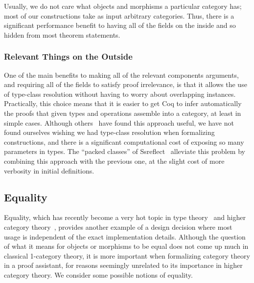 \documentclass[runningheads]{llncs}
\begin{document}
  	  Usually, we do not care what objects and morphisms a particular category has; most of our constructions take as input arbitrary categories.  Thus, there is a significant performance benefit to having all of the fields on the inside and so hidden from most theorem statements.

    \subsubsection{Relevant Things on the Outside}
      One of the main benefits to making all of the relevant components arguments, and requiring all of the fields to satisfy proof irrelevance, is that it allows the use of type-class resolution without having to worry about overlapping instances.  Practically, this choice means that it is easier to get Coq to infer automatically the proofs that given types and operations assemble into a category, at least in simple cases.  Although others~\cite{spitters2010developing} have found this approach useful, we have not found ourselves wishing we had type-class resolution when formalizing constructions, and there is a significant computational cost of exposing so many parameters in types.  The ``packed classes'' of Ssreflect~\cite{Garillot2009%
      } alleviate this problem by combining this approach with the previous one, at the slight cost of more verbosity in initial definitions.

  \subsection{Equality} \label{sec:equality}
    Equality, which has recently become a very hot topic in type theory~\cite{HoTTBook} and higher category theory~\cite{Leinster2007}, provides another example of a design decision where most usage is independent of the exact implementation details.  Although the question of what it means for objects or morphisms to be equal does not come up much in classical 1-category theory, it is more important when formalizing category theory in a proof assistant, for reasons seemingly unrelated to its importance in higher category theory.  We consider some possible notions of equality.
\end{document}
